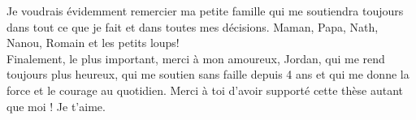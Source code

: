 Je voudrais évidemment remercier ma petite famille qui me soutiendra toujours dans tout ce que je fait et dans toutes mes décisions. Maman, Papa, Nath, Nanou, Romain et les petits loups!\\

Finalement, le plus important, merci à mon amoureux, Jordan, qui me rend toujours plus heureux, qui me soutien sans faille depuis 4 ans et qui me donne la force et le courage au quotidien. Merci à toi d'avoir supporté cette thèse autant que moi ! Je t'aime. 



